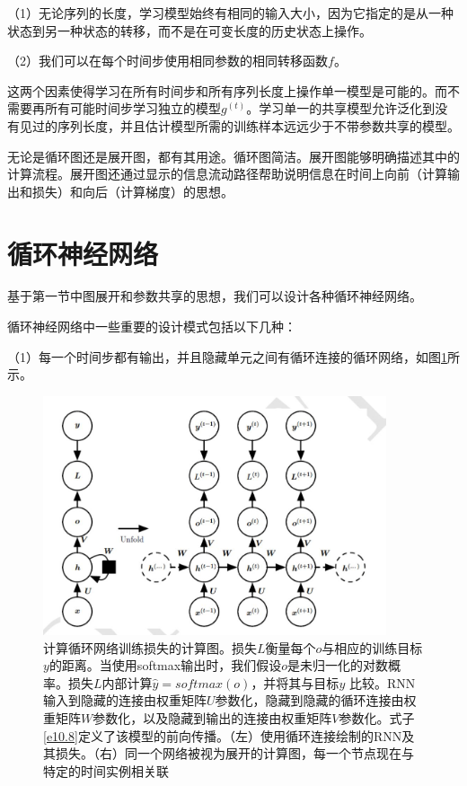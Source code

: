 \documentclass{ctexart}
\begin{document}
        （1）无论序列的长度，学习模型始终有相同的输入大小，因为它指定的是从一种状态到另一种状态的转移，而不是在可变长度的历史状态上操作。

        （2）我们可以在每个时间步使用相同参数的相同转移函数$f$。

        这两个因素使得学习在所有时间步和所有序列长度上操作单一模型是可能的。而不需要再所有可能时间步学习独立的模型$g^{(t)}$。学习单一的共享模型允许泛化到没有见过的序列长度，并且估计模型所需的训练样本远远少于不带参数共享的模型。

        无论是循环图还是展开图，都有其用途。循环图简洁。展开图能够明确描述其中的计算流程。展开图还通过显示的信息流动路径帮助说明信息在时间上向前（计算输出和损失）和向后（计算梯度）的思想。

    \section{循环神经网络}
        基于第一节中图展开和参数共享的思想，我们可以设计各种循环神经网络。

        循环神经网络中一些重要的设计模式包括以下几种：

        （1）每一个时间步都有输出，并且隐藏单元之间有循环连接的循环网络，如图\ref{f10.3}所示。
        \begin{figure}[h]
            \centering
            \includegraphics[width=0.9\textwidth]{f3}
            \caption{计算循环网络训练损失的计算图。损失$L$衡量每个$o$与相应的训练目标$y$的距离。当使用softmax输出时，我们假设$o$是未归一化的对数概率。损失$L$内部计算$\hat{y}=softmax(o)$，并将其与目标$y$ 比较。RNN输入到隐藏的连接由权重矩阵$U$参数化，隐藏到隐藏的循环连接由权重矩阵$W$参数化，以及隐藏到输出的连接由权重矩阵$V$参数化。式子\ref{e10.8}定义了该模型的前向传播。（左）使用循环连接绘制的RNN及其损失。（右）同一个网络被视为展开的计算图，每一个节点现在与特定的时间实例相关联}
            \label{f10.3}
        \end{figure}
\end{document}
